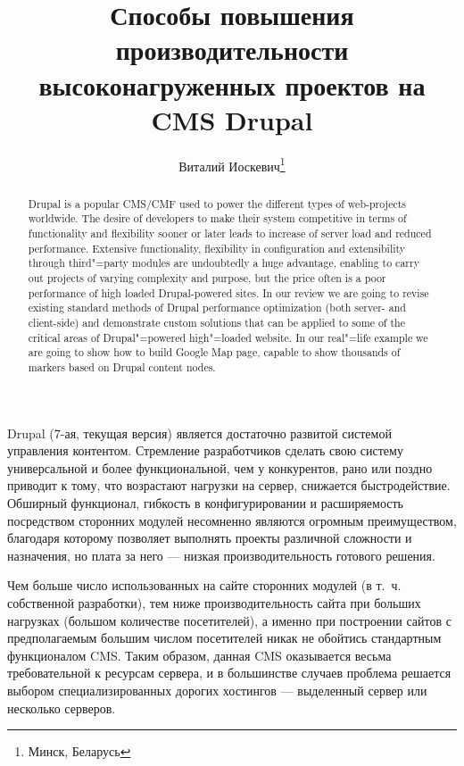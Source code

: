 \documentclass[10pt, a5paper]{article}
\begin{document}
\title{Способы повышения производительности высоконагруженных проектов на CMS Drupal}

\author{Виталий Иоскевич\footnote{Минск, Беларусь}}
\date{}
\maketitle
\renewcommand{\abstractname}{Abstract}
\begin{abstract}
Drupal is a popular CMS/CMF used to power the different types of web-projects worldwide. The desire of developers to make their system competitive in terms of functionality and flexibility sooner or later leads to increase of server load and reduced performance. Extensive functionality, flexibility in \linebreak configuration and extensibility through third"=party modules are undoubtedly a huge advantage, enabling to carry out projects of varying complexity and purpose, but the price often is a poor performance of high loaded Drupal-powered sites.
In our review we are going to revise existing standard methods of Drupal \linebreak performance optimization (both server- and client-side) and \linebreak demonstrate custom solutions that can be applied to some of the critical areas of Drupal"=powered high"=loaded website. In our real"=life example we are going to show how to build Google Map page, capable to show thousands of markers based on Drupal content nodes.
\end{abstract}
  
Drupal (7-ая, текущая версия) является достаточно развитой системой управления контентом. Стремление разработчиков сделать свою систему универсальной и более функциональной, чем у конкурентов, рано или поздно приводит к тому, что возрастают нагрузки на сервер, снижается быстродействие. Обширный функционал, гибкость в конфигурировании и расширяемость посредством сторонних модулей несомненно являются огромным преимуществом, благодаря которому позволяет выполнять проекты различной сложности и назначения, но плата за него --- низкая производительность готового решения. 

Чем больше число использованных на сайте сторонних модулей (в т.~ч. собственной разработки), тем ниже производительность сайта при больших нагрузках (большом количестве посетителей), а именно при построении сайтов с предполагаемым большим числом  посетителей никак не обойтись стандартным функционалом CMS. Таким образом, данная CMS оказывается весьма требовательной к ресурсам сервера, и в большинстве случаев проблема  решается выбором специализированных дорогих хостингов --- выделенный сервер или несколько серверов. 
\end{document}
